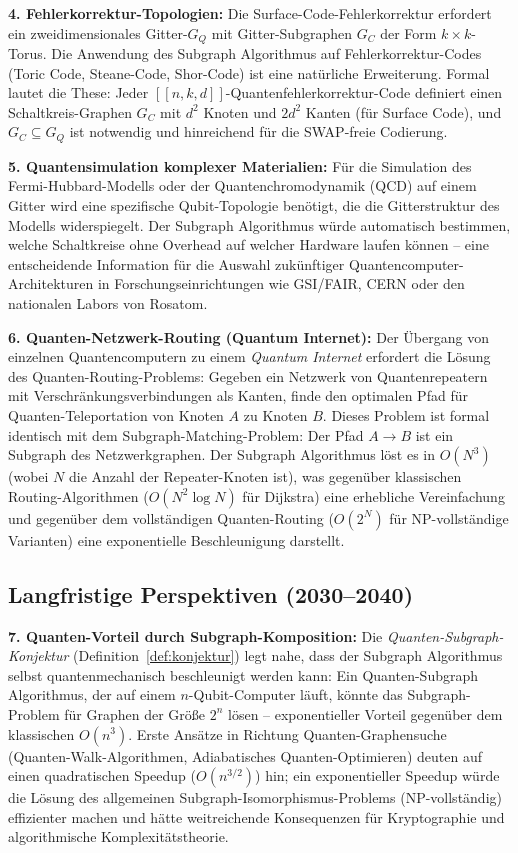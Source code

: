 ﻿\documentclass[a4paper,12pt]{article}
\theoremstyle{definition}
\begin{document}
\textbf{4. Fehlerkorrektur-Topologien:}
Die Surface-Code-Fehlerkorrektur erfordert ein zweidimensionales Gitter-$G_Q$
mit Gitter-Subgraphen $G_C$ der Form $k \times k$-Torus. Die Anwendung des
Subgraph Algorithmus auf Fehlerkorrektur-Codes (Toric Code, Steane-Code,
Shor-Code) ist eine natürliche Erweiterung. Formal lautet die These: Jeder
$[[n, k, d]]$-Quantenfehlerkorrektur-Code definiert einen Schaltkreis-Graphen
$G_C$ mit $d^2$ Knoten und $2d^2$ Kanten (für Surface Code), und
$G_C \subseteq G_Q$ ist notwendig und hinreichend für die SWAP-freie Codierung.

\textbf{5. Quantensimulation komplexer Materialien:}
Für die Simulation des Fermi-Hubbard-Modells oder der Quantenchromodynamik
(QCD) auf einem Gitter wird eine spezifische Qubit-Topologie benötigt, die
die Gitterstruktur des Modells widerspiegelt. Der Subgraph Algorithmus würde
automatisch bestimmen, welche Schaltkreise ohne Overhead auf welcher Hardware
laufen können -- eine entscheidende Information für die Auswahl zukünftiger
Quantencomputer-Architekturen in Forschungseinrichtungen wie GSI/FAIR,
CERN oder den nationalen Labors von Rosatom.

\textbf{6. Quanten-Netzwerk-Routing (Quantum Internet):}
Der Übergang von einzelnen Quantencomputern zu einem \emph{Quantum Internet}
erfordert die Lösung des Quanten-Routing-Problems: Gegeben ein Netzwerk von
Quantenrepeatern mit Verschränkungsverbindungen als Kanten, finde den optimalen
Pfad für Quanten-Teleportation von Knoten $A$ zu Knoten $B$. Dieses Problem ist
formal identisch mit dem Subgraph-Matching-Problem: Der Pfad $A \to B$ ist ein
Subgraph des Netzwerkgraphen. Der Subgraph Algorithmus löst es in $O(N^3)$
(wobei $N$ die Anzahl der Repeater-Knoten ist), was gegenüber klassischen
Routing-Algorithmen ($O(N^2 \log N)$ für Dijkstra) eine erhebliche Vereinfachung
und gegenüber dem vollständigen Quanten-Routing ($O(2^N)$ für NP-vollständige
Varianten) eine exponentielle Beschleunigung darstellt.

\subsection{Langfristige Perspektiven (2030--2040)}

\textbf{7. Quanten-Vorteil durch Subgraph-Komposition:}
Die \emph{Quanten-Subgraph-Konjektur} (Definition~\ref{def:konjektur}) legt
nahe, dass der Subgraph Algorithmus selbst quantenmechanisch beschleunigt
werden kann: Ein Quanten-Subgraph Algorithmus, der auf einem $n$-Qubit-Computer
läuft, könnte das Subgraph-Problem für Graphen der Größe $2^n$ lösen --
exponentieller Vorteil gegenüber dem klassischen $O(n^3)$. Erste Ansätze
in Richtung Quanten-Graphensuche (Quanten-Walk-Algorithmen, Adiabatisches
Quanten-Optimieren) deuten auf einen quadratischen Speedup ($O(n^{3/2})$)
hin; ein exponentieller Speedup würde die Lösung des allgemeinen
Subgraph-Isomorphismus-Problems (NP-vollständig) effizienter machen und
hätte weitreichende Konsequenzen für Kryptographie und algorithmische
Komplexitätstheorie.
\end{document}
